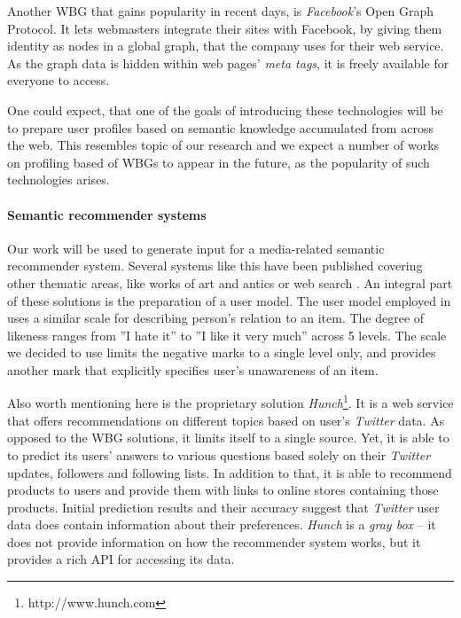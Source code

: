 Another WBG that gains popularity in recent days, is \textit{Facebook}'s Open Graph
Protocol. It lets webmasters integrate their sites with Facebook, by giving them
identity as nodes in a global graph, that the company uses for their
web service. As the graph data is hidden within web pages' \textit{meta tags},
it is freely available for everyone to access.

One could expect, that one of the goals of introducing these technologies will
be to prepare user profiles based on semantic knowledge accumulated from across
the web.  This resembles topic of our research and we expect a number of works
on profiling based of WBGs to appear in the future, as the
popularity of such technologies arises.

\paragraph{Semantic recommender systems} Our work will be used to generate input
for a media-related semantic recommender system. Several systems like this have
been published covering other thematic areas, like works of art and
antics \cite{museums} or web search \cite{social-tagging}. An integral part of
these solutions is the preparation of a user model. The user model employed in
\cite{museums} uses a similar scale for describing person's relation to an item.
The degree of likeness ranges from ''I hate it'' to ''I like it very much''
across 5 levels. The scale we decided to use limits the negative marks to
a single level only, and provides another mark that explicitly specifies user's unawareness
of an item.

Also worth mentioning here is the proprietary solution
\textit{Hunch}\footnote{http://www.hunch.com}. It is a web service that offers
recommendations on different topics based on user's \textit{Twitter} data. As
opposed to the WBG solutions, it limits itself to a single source. Yet, it is
able to to predict its users' answers to various questions based solely on their
\textit{Twitter} updates, followers and following lists.
In addition to that, it is able to recommend products
to users and provide them with links to online stores containing those products.
Initial prediction results and their accuracy suggest that
\textit{Twitter} user data does contain information about their preferences.
\textit{Hunch} is a \textit{gray box}
--  it does not provide information on how the recommender system works, but it
provides a rich API for accessing its data.
